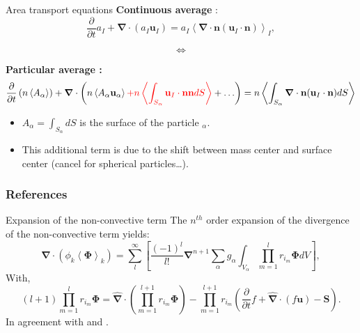 \documentclass{sintefbeamer}
\newcommand{\kavg}[1]{\left<#1\right>_k}
\newcommand{\Iavg}[1]{\left<#1\right>_I}
\newcommand{\pavg}[1]{n \left<#1\right>}
\newcommand{\nablab}{\bm{\nabla}}
\newcommand{\nablabh}{\hat{\bm{\nabla}}}
\newcommand{\pddt}{\frac{\partial}{\partial t}}
\begin{document}
\begin{frame}
  {Area transport equations}
  \textbf{Continuous average} :
  \begin{equation}
    \pddt a_I
    + \nablab \cdot \left(a_I \textbf{u}_I
    \right) 
    = a_I\Iavg{\nablab \cdot \textbf{n} (\textbf{u}_I \cdot \textbf{n})},
\end{equation}

  \begin{center}
    \begin{equation*}
      \Longleftrightarrow 
    \end{equation*}
  \end{center}
  \textbf{Particular average :}
  \begin{equation}
    \pddt   \left(\pavg{A_\alpha}\right)
    + \nablab \cdot \left(\pavg{A_\alpha \textbf{u}_\alpha} 
    \textcolor{red}{+ \pavg{\int_{S_\alpha} \textbf{u}_I \cdot \textbf{nn} dS}}
    +\ldots
    \right) 
    = \pavg{\int_{S_\alpha} \nablab \cdot \textbf{n} (\textbf{u}_I \cdot \textbf{n}) dS}
\end{equation}

\begin{itemize}
  \item $A_\alpha = \int_{S_\alpha} dS$ is the surface of the particle $_\alpha$.  
  \item This additional term is due to the shift between mass center and surface center (cancel for spherical particles\ldots). 
\end{itemize}

\end{frame}


\begin{frame}[t]
  \frametitle{References}
  
\end{frame}
\backmatter


\begin{frame}  {Expansion of the non-convective term}
  The $n^{th}$ order expansion of the divergence of the non-convective term yields:
  \begin{equation}
    \nablab\cdot
    (\phi_k \kavg{\bm{\Phi}})=
    \sum_l^\infty
    \left[
        \frac{(-1)^{l}}{l!}
        \nablab^{n+1}
        \sum_{\alpha}
        g_{\alpha}
        \int_{V_\alpha}
        \prod^{l}_{m=1}
        r_{i_m} \bm{\Phi}dV
    \right],
\end{equation}
With,
\begin{equation}
    (l+1) \prod^{l}_{m=1} r_{i_m} \bm{\Phi}
    =\nablabh \cdot \left(\prod^{l+1}_{m=1} r_{i_m} \bm{\Phi}\right)
    - \prod^{l+1}_{m=1} r_{i_m} \left(
        \pddt f 
        + \nablabh \cdot (f \textbf{u})
        - \textbf{S}
    \right).
\end{equation}
In agreement with \citet{nott2011suspension} and \citet{prosperetti2004average}.
\end{frame}
\end{document}
